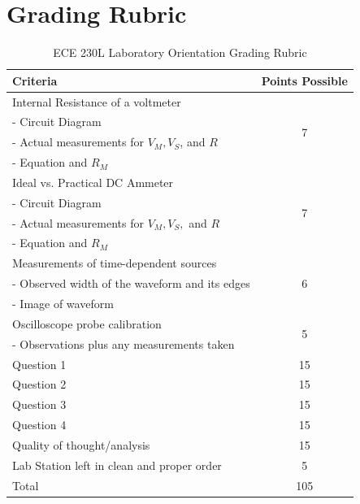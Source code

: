 \documentclass[12pt]{../manual}
\begin{document}
\section*{Grading Rubric}
\vfill
\begin{table}[ht!]
\caption{ECE 230L Laboratory Orientation Grading Rubric}
\centering
\begin{tabular}{l|c} \hline
Criteria & Points Possible \\ \hline \hline
Internal Resistance of a voltmeter					& \multirow{4}{*}{7} \\
-	Circuit Diagram									& \\
-	Actual measurements for $V_M, V_S$, and $R$		& \\
-	Equation and $R_M$								& \\ \hline
Ideal vs. Practical DC Ammeter						& \multirow{4}{*}{7} \\
-	Circuit Diagram									& \\
-	Actual measurements for $V_M, V_S,$ and $R$		& \\
-	Equation and $R_M$									& \\ \hline
Measurements of time-dependent sources				& \multirow{3}{*}{6} \\
-	Observed width of the waveform and its edges	& \\ 
-	Image of waveform 								& \\ \hline
Oscilloscope probe calibration						& \multirow{2}{*}{5} \\ 
-	Observations plus any measurements taken		& \\ \hline
Question 1											& 15 \\ \hline
Question 2											& 15 \\ \hline
Question 3											& 15 \\ \hline
Question 4											& 15 \\ \hline
Quality of thought/analysis							& 15 \\ \hline
Lab Station left in clean and proper order			& 5 \\ \hline \hline
Total												& 105 \\ \hline
\end{tabular}
\end{table}
\vfill
%
\end{document}
